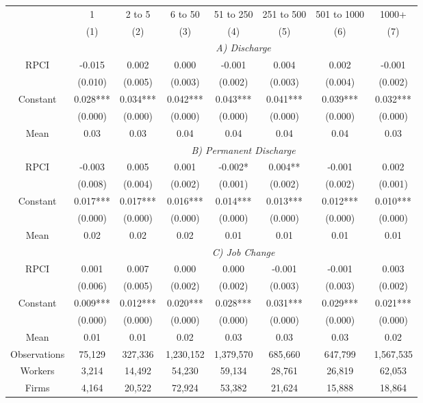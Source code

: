 \begin{tabular}{cccccccc}
\toprule
\toprule
      & 1     & 2 to 5 & 6 to 50 & 51 to 250 & 251 to 500 & 501 to 1000 & 1000+ \\
      & (1)   & (2)   & (3)   & (4)   & (5)   & (6)   & (7) \\
\cmidrule{2-8}      & \multicolumn{7}{c}{\textit{A) Discharge}} \\
\midrule
RPCI  & -0.015 & 0.002 & 0.000 & -0.001 & 0.004 & 0.002 & -0.001 \\
      & (0.010) & (0.005) & (0.003) & (0.002) & (0.003) & (0.004) & (0.002) \\
Constant & 0.028*** & 0.034*** & 0.042*** & 0.043*** & 0.041*** & 0.039*** & 0.032*** \\
      & (0.000) & (0.000) & (0.000) & (0.000) & (0.000) & (0.000) & (0.000) \\
Mean  & 0.03  & 0.03  & 0.04  & 0.04  & 0.04  & 0.04  & 0.03 \\
\cmidrule{2-8}      & \multicolumn{7}{c}{\textit{B) Permanent Discharge}} \\
\midrule
RPCI  & -0.003 & 0.005 & 0.001 & -0.002* & 0.004** & -0.001 & 0.002 \\
      & (0.008) & (0.004) & (0.002) & (0.001) & (0.002) & (0.002) & (0.001) \\
Constant & 0.017*** & 0.017*** & 0.016*** & 0.014*** & 0.013*** & 0.012*** & 0.010*** \\
      & (0.000) & (0.000) & (0.000) & (0.000) & (0.000) & (0.000) & (0.000) \\
Mean  & 0.02  & 0.02  & 0.02  & 0.01  & 0.01  & 0.01  & 0.01 \\
\cmidrule{2-8}      & \multicolumn{7}{c}{\textit{C) Job Change}} \\
\midrule
RPCI  & 0.001 & 0.007 & 0.000 & 0.000 & -0.001 & -0.001 & 0.003 \\
      & (0.006) & (0.005) & (0.002) & (0.002) & (0.003) & (0.003) & (0.002) \\
Constant & 0.009*** & 0.012*** & 0.020*** & 0.028*** & 0.031*** & 0.029*** & 0.021*** \\
      & (0.000) & (0.000) & (0.000) & (0.000) & (0.000) & (0.000) & (0.000) \\
Mean  & 0.01  & 0.01  & 0.02  & 0.03  & 0.03  & 0.03  & 0.02 \\
Observations & 75,129 & 327,336 & 1,230,152 & 1,379,570 & 685,660 & 647,799 & 1,567,535 \\
Workers & 3,214 & 14,492 & 54,230 & 59,134 & 28,761 & 26,819 & 62,053 \\
Firms & 4,164 & 20,522 & 72,924 & 53,382 & 21,624 & 15,888 & 18,864 \\
\bottomrule
\bottomrule
\end{tabular}%
